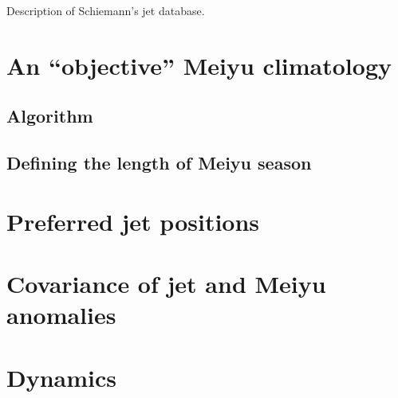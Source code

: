 \documentclass[draft,grl]{AGUTeX}
\begin{document}
\begin{article}
Description of Schiemann's jet database.
	
\section{An ``objective'' Meiyu climatology}
\subsection{Algorithm}
	
\subsection{Defining the length of Meiyu season}	
	
\section{Preferred jet positions}
	
\section{Covariance of jet and Meiyu anomalies}
	
\section{Dynamics}


\end{article}
\end{document}
